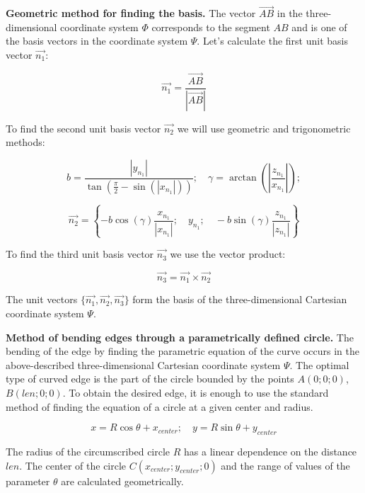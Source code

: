 \textbf{Geometric method for finding the basis.} The vector $\overrightarrow{AB}$ in the three-dimensional coordinate system $\Phi$ corresponds to the segment $AB$ and is one of the basis vectors in the coordinate system $\Psi$. Let's calculate the first unit basis vector $\overrightarrow{n_1}$:

$$
\overrightarrow{n_1} = \frac
{\overrightarrow{AB}}
{\left|\overrightarrow{AB}\right|}
$$

To find the second unit basis vector $\overrightarrow{n_2}$ we will use geometric and trigonometric methods:

$$
b = \frac
{\left|y_{n_1}\right|}
{\tan\left(
\frac{\pi}{2}
-\sin(\left|x_{n_1}\right|)
\right)};
\quad
\gamma = \arctan\left(
\left|
\frac{z_{n_1}}{x_{n_1}}
\right|
\right);
$$

$$
\overrightarrow{n_2} = \left\{
-b\cos(\gamma)
\frac{x_{n_1}}
{\left|x_{n_1}\right|};
\quad
y_{n_1};
\quad
-b\sin(\gamma)
\frac{z_{n_1}}
{\left|z_{n_1}\right|}
\right\}
$$

To find the third unit basis vector $\overrightarrow{n_3}$ we use the vector product:

$$
\overrightarrow{n_3} = \overrightarrow{n_1} \times \overrightarrow{n_2}
$$

The unit vectors $\{\overrightarrow{n_1}, \overrightarrow{n_2}, \overrightarrow{n_3}\}$ form the basis of the three-dimensional Cartesian coordinate system $\Psi$.

\textbf{Method of bending edges through a parametrically defined circle.} The bending of the edge by finding the parametric equation of the curve occurs in the above-described three-dimensional Cartesian coordinate system $\Psi$. The optimal type of curved edge is the part of the circle bounded by the points $A(0; 0; 0)$, $B\left(len; 0; 0 \right)$. To obtain the desired edge, it is enough to use the standard method of finding the equation of a circle at a given center and radius.

$$
x = R\cos\theta + x_{center};
\quad
y = R\sin\theta + y_{center}
$$

The radius of the circumscribed circle $R$ has a linear dependence on the distance $len$. The center of the circle $C(x_{center}; y_{center}; 0)$ and the range of values of the parameter $\theta$ are calculated geometrically.